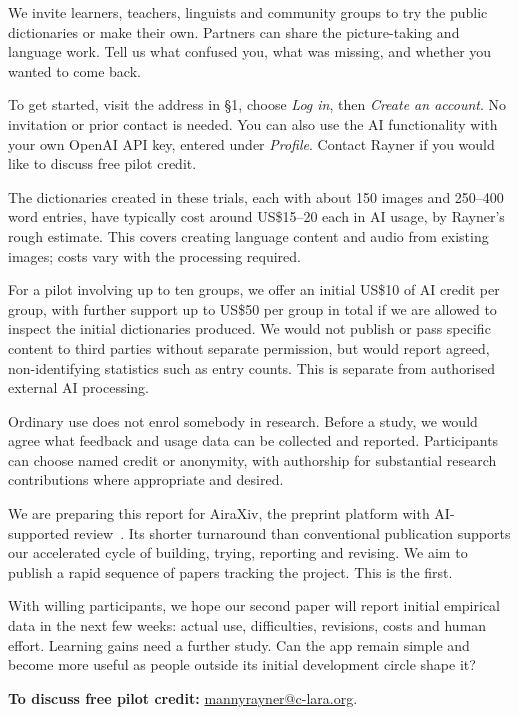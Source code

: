 \documentclass[11pt,a4paper]{article}
\newcommand{\topic}[1]{\vspace{6pt}{\large\bfseries\color{accent}#1\par}\vspace{2pt}}
\begin{document}
\topic{6. An invitation to help shape the next version}
We invite learners, teachers, linguists and community groups to try the public
dictionaries or make their own. Partners can share the picture-taking and
language work. Tell us what confused you, what was missing, and whether you
wanted to come back.

To get started, visit the address in \S1, choose \emph{Log in}, then
\emph{Create an account}. No invitation or prior contact is needed. You can also
use the AI functionality with your own OpenAI API key, entered under
\emph{Profile}. Contact Rayner if you would like to discuss free pilot credit.

The dictionaries created in these trials, each with about 150 images and
250--400 word entries, have typically cost around US\$15--20 each in AI usage,
by Rayner's rough estimate. This covers creating language content and audio from
existing images; costs vary with the processing required.

For a pilot involving up to ten groups, we offer an initial US\$10 of AI credit
per group, with further support up to US\$50 per group in total if we are allowed
to inspect the initial dictionaries produced.
We would not publish or pass specific content to third parties without separate
permission, but would report agreed, non-identifying statistics such as entry
counts. This is separate from authorised external AI processing.

Ordinary use does not enrol somebody in research. Before a study, we would agree
what feedback and usage data can be collected and reported. Participants can
choose named credit or anonymity, with authorship for substantial research
contributions where appropriate and desired.

We are preparing this report for AiraXiv, the preprint platform with
AI-supported review~\cite{airaxiv}. Its shorter turnaround than conventional
publication supports our accelerated cycle of building, trying, reporting and
revising. We aim to publish a rapid sequence of papers tracking the project.
This is the first.

With willing participants, we hope our second paper will report initial empirical
data in the next few weeks: actual use, difficulties, revisions, costs and human effort. Learning
gains need a further study. Can the app remain simple and become more useful as
people outside its initial development circle shape it?

\textbf{To discuss free pilot credit:}
\href{mailto:mannyrayner@c-lara.org}{mannyrayner@c-lara.org}.
\end{document}
